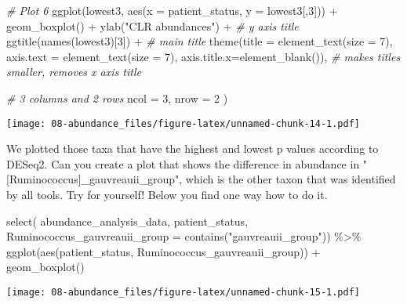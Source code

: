 \documentclass[
  oneside]{book}
\newenvironment{Shaded}{\begin{snugshade}}{\end{snugshade}}
\newcommand{\AttributeTok}[1]{\textcolor[rgb]{0.77,0.63,0.00}{#1}}
\newcommand{\CommentTok}[1]{\textcolor[rgb]{0.56,0.35,0.01}{\textit{#1}}}
\newcommand{\DecValTok}[1]{\textcolor[rgb]{0.00,0.00,0.81}{#1}}
\newcommand{\FunctionTok}[1]{\textcolor[rgb]{0.00,0.00,0.00}{#1}}
\newcommand{\NormalTok}[1]{#1}
\newcommand{\SpecialCharTok}[1]{\textcolor[rgb]{0.00,0.00,0.00}{#1}}
\newcommand{\StringTok}[1]{\textcolor[rgb]{0.31,0.60,0.02}{#1}}
\begin{document}
\begin{Shaded}
\begin{Highlighting}[]
  \CommentTok{\# Plot 6}
  \FunctionTok{ggplot}\NormalTok{(lowest3, }\FunctionTok{aes}\NormalTok{(}\AttributeTok{x =}\NormalTok{ patient\_status, }\AttributeTok{y =}\NormalTok{ lowest3[,}\DecValTok{3}\NormalTok{])) }\SpecialCharTok{+} 
    \FunctionTok{geom\_boxplot}\NormalTok{() }\SpecialCharTok{+} 
    \FunctionTok{ylab}\NormalTok{(}\StringTok{"CLR abundances"}\NormalTok{) }\SpecialCharTok{+} \CommentTok{\# y axis title}
    \FunctionTok{ggtitle}\NormalTok{(}\FunctionTok{names}\NormalTok{(lowest3)[}\DecValTok{3}\NormalTok{]) }\SpecialCharTok{+} \CommentTok{\# main title}
    \FunctionTok{theme}\NormalTok{(}\AttributeTok{title =} \FunctionTok{element\_text}\NormalTok{(}\AttributeTok{size =} \DecValTok{7}\NormalTok{),}
          \AttributeTok{axis.text =} \FunctionTok{element\_text}\NormalTok{(}\AttributeTok{size =} \DecValTok{7}\NormalTok{),}
          \AttributeTok{axis.title.x=}\FunctionTok{element\_blank}\NormalTok{()), }\CommentTok{\# makes titles smaller, removes x axis title}
  
  \CommentTok{\# 3 columns and 2 rows}
  \AttributeTok{ncol =} \DecValTok{3}\NormalTok{, }
  \AttributeTok{nrow =} \DecValTok{2}
\NormalTok{)}
\end{Highlighting}
\end{Shaded}

\texttt{[image: 08-abundance\_files/figure-latex/unnamed-chunk-14-1.pdf]}

We plotted those taxa that have the highest and lowest p values according to DESeq2. Can you create a plot that shows the difference in abundance in "{[}Ruminococcus{]}\_gauvreauii\_group", which is the other taxon that was identified by all tools. Try for yourself! Below you find one way how to do it.

\begin{Shaded}
\begin{Highlighting}[]
\FunctionTok{select}\NormalTok{(}
\NormalTok{  abundance\_analysis\_data, }
\NormalTok{  patient\_status, }
  \AttributeTok{Ruminococcus\_gauvreauii\_group =} \FunctionTok{contains}\NormalTok{(}\StringTok{"gauvreauii\_group"}\NormalTok{)) }\SpecialCharTok{\%\textgreater{}\%}
  \FunctionTok{ggplot}\NormalTok{(}\FunctionTok{aes}\NormalTok{(patient\_status, Ruminococcus\_gauvreauii\_group)) }\SpecialCharTok{+}
  \FunctionTok{geom\_boxplot}\NormalTok{()}
\end{Highlighting}
\end{Shaded}

\texttt{[image: 08-abundance\_files/figure-latex/unnamed-chunk-15-1.pdf]}
\end{document}

